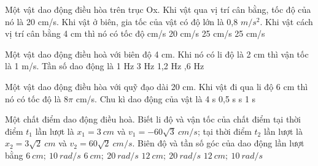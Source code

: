 \begin{ex}%
Một vật dao động điều hòa trên trục Ox. Khi vật qua vị trí cân bằng, tốc độ của nó là 20 cm/s. Khi vật ở biên, gia tốc của vật có độ lớn là 0,8 $m/s^2$. Khi vật cách vị trí cân bằng 4 cm thì nó có tốc độ
\choice
{ cm/s}
{20 cm/s}
{25 cm/s}
{25 cm/s}

\end{ex} 
\begin{ex}%
Một vật dao động điều hoà với biên độ 4 cm. Khi nó có li độ là 2 cm thì vận tốc là 1 m/s. Tần số dao động là
\choice 
{1 Hz}
{3 Hz}
{1,2 Hz}
{,6 Hz}
\end{ex} 
\begin{ex}%
Một vật dao động điều hòa với quỹ đạo dài 20 cm. Khi vật đi qua li độ 6 cm thì nó có tốc độ là $8\pi$  cm/s. Chu kì dao động của vật là
\choice
{4 s}
{0,5 s}
{ s}
{1 s}
\end{ex} 
\begin{ex}
Một chất điểm dao động điều hoà. Biết li độ và vận tốc của chất điểm tại thời điểm $t_1$ lần lượt là $x_1=3\ cm$ và $v_1=-60\sqrt 3\ cm/s$; tại thời điểm $t_2$ lần lượt là $x_2=3\sqrt 2\ cm$ và $v_2=60\sqrt 2\ cm/s$. Biên độ và tần số góc của dao động lần lượt bằng
\choice
{$6\ cm;\ 10\ rad/s$}
{\True $6\ cm;\ 20\ rad/s$}
{$12\ cm;\ 20\ rad/s$}
{$12\ cm;\ 10\ rad/s$}
\end{ex} 

